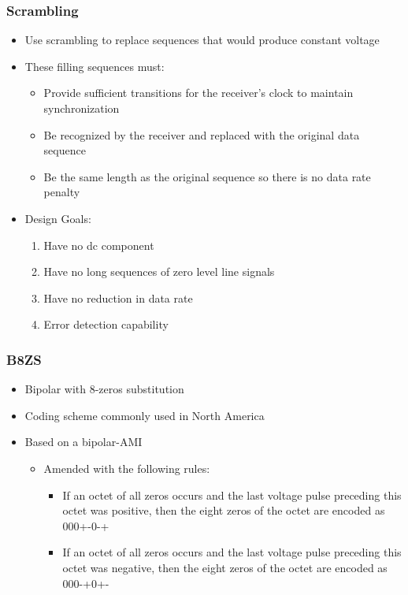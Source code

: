 \documentclass[pdflatex,compress]{beamer}
\begin{document}
\begin{frame}
	\frametitle{Scrambling}
	\begin{itemize}
		\item Use scrambling to replace sequences that would produce constant voltage
		\item These filling sequences must:
		\begin{itemize}
			\item Provide sufficient transitions for the receiver’s clock to maintain synchronization
			\item Be recognized by the receiver and replaced with the original data sequence
			\item Be the same length as the original sequence so there is no data rate penalty
		\end{itemize}
		\item Design Goals:
		\begin{enumerate}
			\item Have no dc component
			\item Have no long sequences of zero level line signals
			\item Have no reduction in data rate
			\item Error detection capability
		\end{enumerate}
	\end{itemize}
\end{frame}

\begin{frame}
	\frametitle{B8ZS}
	\begin{itemize}
		\item Bipolar with 8-zeros substitution
		\item Coding scheme commonly used in North America
		\item Based on a bipolar-AMI
		\begin{itemize}
			\item Amended with the following rules:
			\begin{itemize}
				\item If an octet of all zeros occurs and the last voltage pulse preceding this octet was positive, then the eight zeros of the octet are encoded as 000+-0-+
				\item If an octet of all zeros occurs and the last voltage pulse preceding this octet was negative, then the eight zeros of the octet are encoded as 000-+0+-
			\end{itemize}
		\end{itemize}
	\end{itemize}
\end{frame}
\end{document}
